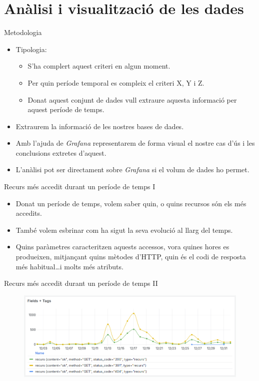 \section{Anàlisi i visualització de les dades}\label{sec:data-analysis}

\begin{frame}{Metodologia}
    \begin{itemize}
        \item Tipologia:
        \begin{itemize}
            \item S’ha complert aquest criteri en algun moment.
            \item Per quin període temporal es compleix el criteri X, Y i Z.
            \item Donat aquest conjunt de dades vull extraure aquesta informació per aquest període de temps.
        \end{itemize}
        \item Extraurem la informació de les nostres bases de dades.
        \item Amb l’ajuda de \textit{Grafana} representarem de forma visual el nostre cas d’ús i les conclusions extretes d’aquest.
        \item L'anàlisi pot ser directament sobre \textit{Grafana} si el volum de dades ho permet.
    \end{itemize}
\end{frame}

\begin{frame}{Recurs més accedit durant un període de temps I}
    \begin{itemize}
        \item Donat un període de temps, volem saber quin, o quins recursos són els més accedits.
        \item També volem esbrinar com ha sigut la seva evolució al llarg del temps.
        \item Quins paràmetres caracteritzen aquests accessos, vora quines hores es produeixen, mitjançant quins mètodes d'HTTP, quin és el codi de resposta més habitual\dots i molts més atributs.
    \end{itemize}
\end{frame}

\begin{frame}{Recurs més accedit durant un període de temps II}
    \begin{figure}
        \includegraphics[width=\textwidth]{figures/most-accessed-resource}\label{fig:use-case-1}
    \end{figure}
\end{frame}

